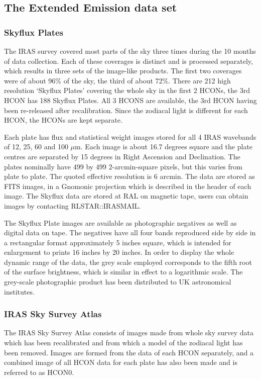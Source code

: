 \documentclass[11pt,nolof,noabs]{starlink}
\begin{document}
\subsection{The Extended Emission data set}

\subsubsection{Skyflux Plates}
The IRAS survey covered most parts of the sky three times during the 10 months
of data collection. Each of these coverages is distinct and is processed
separately, which results in three sets of the image-like products. The first
two coverages were of about 96\% of the sky, the third of about 72\%.
There are 212 high resolution `Skyflux Plates' covering the whole sky in the
first 2 HCONs, the 3rd HCON has 188 Skyflux Plates. All 3 HCONS are available,
the 3rd HCON having been re-released after recalibration.
Since the zodiacal light is different for each HCON, the HCONs are kept
separate.

Each plate has flux and statistical weight images stored for all 4 IRAS
wavebands of 12, 25, 60 and 100 $\mu$m.
Each image is about 16.7 degrees square and the plate centres are separated by
15 degrees in Right Ascension and Declination. The plates nominally have
499 by 499 2-arcmin-square pixels, but this varies from plate to plate.
The quoted effective resolution is 6 arcmin.
The data are stored as FITS images, in a Gnomonic projection which is
described in the header of each image.
The Skyflux data are stored at RAL on magnetic tape, users can obtain
images by contacting RLSTAR::IRASMAIL.

The Skyflux Plate images are available as photographic negatives as well as
digital data on tape.
The negatives have all four bands reproduced side by side in a rectangular
format approximately 5 inches square, which is intended for enlargement to
prints 16 inches by 20 inches.
In order to display the whole dynamic range of the data, the grey scale employed
corresponds to the fifth root of the surface brightness, which is similar in
effect to a logarithmic scale.
The grey-scale photographic product has been distributed to UK astronomical
institutes.

\subsubsection{IRAS Sky Survey Atlas}
The IRAS Sky Survey Atlas consists of images made from whole sky survey data
which has been recalibrated and from which a model of the zodiacal light has
been removed.
Images are formed from the data of each HCON separately, and a combined image
of all HCON data for each plate has also been made and is referred to as HCON0.
\end{document}
